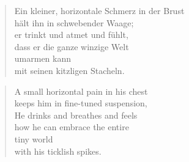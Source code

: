 \clearpage

\begin{verse}
Ein kleiner, horizontale Schmerz in der Brust\\
hält ihn in schwebender Waage;\\
er trinkt und atmet und fühlt,\\
dass er die ganze winzige Welt\\
umarmen kann\\
mit seinen kitzligen Stacheln.
\end{verse}

\clearpage

\begin{verse}
A small horizontal pain in his chest\\
keeps him in fine-tuned suspension,\\
He drinks and breathes and feels\\
how he can embrace the entire\\
tiny world\\
with his ticklish spikes.
\end{verse}

